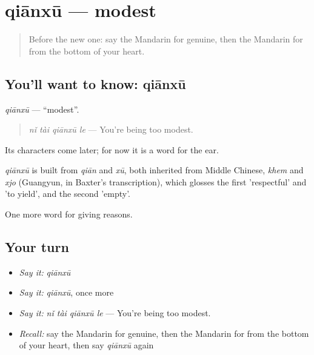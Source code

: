 \section[qiānxū]{qiānxū — modest}

\label{lesson:ZH-C358-qianxu}



\begin{quote}
Before the new one: say the Mandarin for genuine, then the Mandarin for from the bottom of your heart.
\end{quote}

\subsection*{You'll want to know: qiānxū}
\emph{qiānxū} — \textquotedblleft{}modest\textquotedblright{}.

\begin{quote}
\emph{nǐ tài qiānxū le} — You're being too modest.
\end{quote}

Its characters come later; for now it is a word for the ear.

\begin{cousinweb}
\emph{qiānxū} is built from \emph{qiān} and \emph{xū}, both inherited from Middle Chinese, \emph{khem} and \emph{xjo} (Guangyun, in Baxter's transcription), which glosses the first 'respectful' and 'to yield', and the second 'empty'.
\end{cousinweb}

\begin{grammarlens}[title={What you've built}]
One more word for giving reasons.
\end{grammarlens}

\subsection*{Your turn}
\begin{itemize}
\raggedright
  \item \emph{Say it:} \emph{qiānxū}
  \item \emph{Say it:} \emph{qiānxū}, once more
  \item \emph{Say it:} \emph{nǐ tài qiānxū le} — You're being too modest.
  \item \emph{Recall:} say the Mandarin for genuine, then the Mandarin for from the bottom of your heart, then say \emph{qiānxū} again
\end{itemize}

